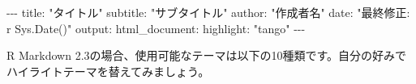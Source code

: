 \documentclass[
  a4paper,
  pandoc,
  ja=standard,
  jafont=haranoaji]{bxjsbook}
\newenvironment{Shaded}{\begin{snugshade}}{\end{snugshade}}
\newcommand{\AttributeTok}[1]{\textcolor[rgb]{0.00,0.48,0.65}{#1}}
\newcommand{\FunctionTok}[1]{\textcolor[rgb]{0.28,0.35,0.67}{#1}}
\newcommand{\KeywordTok}[1]{\textcolor[rgb]{0.00,0.48,0.65}{#1}}
\newcommand{\PreprocessorTok}[1]{\textcolor[rgb]{0.68,0.00,0.00}{#1}}
\newcommand{\StringTok}[1]{\textcolor[rgb]{0.13,0.47,0.30}{#1}}
\begin{document}
\begin{Shaded}
\begin{Highlighting}[]
\PreprocessorTok{{-}{-}{-}}
\FunctionTok{title}\KeywordTok{:}\AttributeTok{ }\StringTok{"タイトル"}
\FunctionTok{subtitle}\KeywordTok{:}\AttributeTok{ }\StringTok{"サブタイトル"}
\FunctionTok{author}\KeywordTok{:}\AttributeTok{ }\StringTok{"作成者名"}
\FunctionTok{date}\KeywordTok{:}\AttributeTok{ }\StringTok{"最終修正: \textasciigrave{}r Sys.Date()\textasciigrave{}"}
\FunctionTok{output}\KeywordTok{:}
\AttributeTok{  }\FunctionTok{html\_document}\KeywordTok{:}
\AttributeTok{    }\FunctionTok{highlight}\KeywordTok{:}\AttributeTok{ }\StringTok{"tango"}
\PreprocessorTok{{-}{-}{-}}
\end{Highlighting}
\end{Shaded}

R Markdown
2.3の場合、使用可能なテーマは以下の10種類です。自分の好みでハイライトテーマを替えてみましょう。
\end{document}
